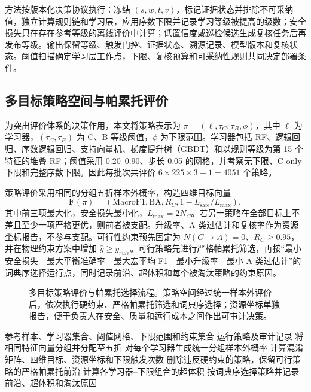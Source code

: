 \documentclass[10pt,twocolumn,a4paper]{ctexart}
\newcommand{\Lsafe}{L_{\mathrm{safe}}}
\begin{document}
方法按版本化决策协议执行：冻结 $(s,w,t,v)$，标记证据状态并排除不可采纳值，独立计算规则链和学习层，应用序数下限并记录学习等级被提高的级数；安全损失只在存在参考等级的离线评价中计算；低置信度或巡检候选生成复核任务后再发布等级。输出保留等级、触发门控、证据状态、溯源记录、模型版本和复核状态。阈值扫描确定学习层工作点，下限、复核预算和可采纳性规则共同决定部署条件。


\subsection{多目标策略空间与帕累托评价}
为突出评价体系的决策作用，本文将策略表示为
\(\pi=(\ell,\tau_C,\tau_B,\phi)\)，其中 \(\ell\) 为学习器，\((\tau_C,\tau_B)\) 为 C、B 等级阈值，\(\phi\) 为下限范围。学习器包括 RF、逻辑回归、序数逻辑回归、支持向量机、梯度提升树（GBDT）和以规则等级为第 15 个特征的堆叠 RF；阈值采用 0.20--0.90、步长 0.05 的网格，并考察无下限、C-only 下限和完整序数下限。因此每批次共评价 \(6\times225\times3+1=4051\) 个策略。

策略评价采用相同的分组五折样本外概率，构造四维目标向量
\begin{equation}
\mathbf F(\pi)=(\mathrm{MacroF1},\mathrm{BA},R_C,1-\Lsafe/L_{\max}),
\end{equation}
其中前三项最大化，安全损失最小化，\(L_{\max}=2N_C\)。若另一策略在全部目标上不差且至少一项严格更优，则前者被支配。升级率、A 类过估计和复核率作为资源坐标报告，不参与支配。可行性约束预先固定为 \(N(C\to A)=0\)、\(R_C\geq0.95\)，并在物理约束方案中增加 \(\hat y\geq y_{rule}\)。可行策略先进行严格帕累托筛选，再按“最小安全损失—最大平衡准确率—最大宏平均 F1—最小升级率—最小 A 类过估计”的词典序选择运行点，同时记录前沿、超体积和每个被淘汰策略的约束原因。

\begin{figure}[t]
\centering
\resizebox{\textwidth}{!}{}
\caption{多目标策略评价与帕累托选择流程。策略空间经过统一样本外评价后，依次执行硬约束、严格帕累托筛选和词典序选择；资源坐标单独报告，便于负责人在安全、质量和运行成本之间作出可审计决策。}
\label{fig:pareto}
\end{figure}

\begin{algorithm}[t]
\caption{离线多目标策略选择}
\label{alg:offlinezh}
\begin{algorithmic}[1]
\Require 参考样本、学习器集合、阈值网格、下限范围和约束集合
\Ensure 运行策略及审计记录
\State 将相同特征向量分组并分配至五折
\State 对每个学习器生成统一分组样本外概率
  \State 计算混淆矩阵、四维目标、资源坐标和下限触发次数
\EndFor
\State 删除违反硬约束的策略，保留可行策略的严格帕累托前沿
\State 计算各学习器--下限组合的超体积
\State 按词典序选择策略并记录前沿、超体积和淘汰原因
\end{algorithmic}
\end{algorithm}
\end{document}
